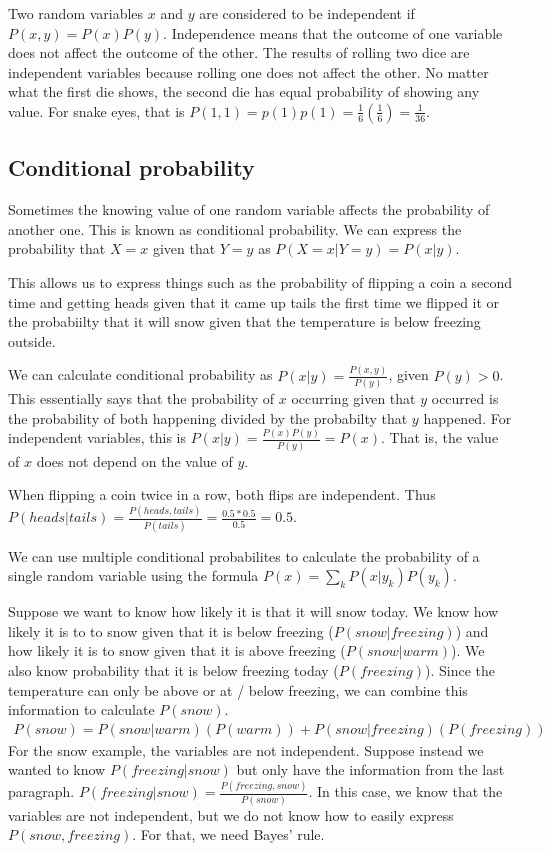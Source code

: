 \documentclass[12pt]{article} %
\begin{document}
Two random variables $x$ and $y$ are considered to be independent if $P(x, y) = P(x)P(y)$.  Independence means that the outcome of one variable does not affect the outcome of the other.  The results of rolling two dice are independent variables because rolling one does not affect the other.  No matter what the first die shows, the second die has equal probability of showing any value.  For snake eyes, that is $P(1, 1) = p(1)p(1) = \frac{1}{6}(\frac{1}{6}) = \frac{1}{36}$.

\subsection{Conditional probability}
Sometimes the knowing value of one random variable affects the probability of another one.  This is known as conditional probability.  We can express the probability that $X = x$ given that $Y = y$ as $P(X = x | Y = y) = P(x|y)$.

This allows us to express things such as the probability of flipping a coin a second time and getting heads given that it came up tails the first time we flipped it or the probabiilty that it will snow given that the temperature is below freezing outside.

We can calculate conditional probability as $P(x|y) = \frac{P(x,y)}{P(y)}$, given $P(y) > 0$.  This essentially says that the probability of $x$ occurring given that $y$ occurred is the probability of both happening divided by the probabilty that $y$ happened.  For independent variables, this is $P(x|y) = \frac{P(x)P(y)}{P(y)} = P(x)$.  That is, the value of $x$ does not depend on the value of $y$.

When flipping a coin twice in a row, both flips are independent.  Thus $P(heads | tails) = \frac{P(heads, tails)}{P(tails)} = \frac{0.5 * 0.5}{0.5} = 0.5$. 

We can use multiple conditional probabilites to calculate the probability of a single random variable using the formula $P(x) = \sum_{k}^{}P(x | y_k)P(y_k)$.

Suppose we want to know how likely it is that it will snow today.  We know how likely it is to to snow given that it is below freezing ($P(snow | freezing)$) and how likely it is to snow given that it is above freezing ($P(snow | warm)$).  We also know probability that it is below freezing today ($P(freezing)$).  Since the temperature can only be above or at / below freezing, we can combine this information to calculate $P(snow)$.
\begin{align}
P(snow) = P(snow | warm)(P(warm)) + P(snow | freezing)(P(freezing))
\end{align}
For the snow example, the variables are not independent.  Suppose instead we wanted to know $P(freezing | snow)$ but only have the information from the last paragraph.  $P(freezing | snow) = \frac{P(freezing, snow)}{P(snow)}$.  In this case, we know that the variables are not independent, but we do not know how to easily express $P(snow, freezing)$.  For that, we need Bayes' rule.
\end{document}
